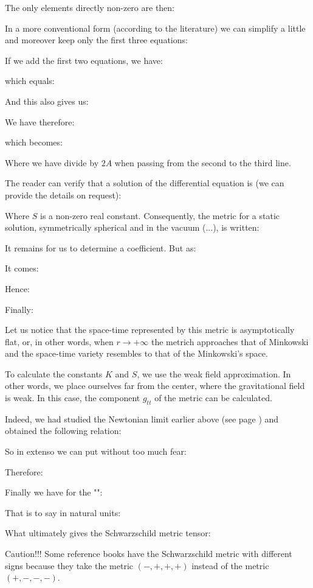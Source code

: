 	The only elements directly non-zero are then:
	
	In a more conventional form (according to the literature) we can simplify a little and moreover keep only the first three equations:
	
	If we add the first two equations, we have:
	
	which equals:
	
	And this also gives us:
	
	We have therefore:
	
	which becomes:
	
	Where we have divide by $2A$ when passing from the second to the third line.

	The reader can verify that a solution of the differential equation is (we can provide the details on request):
	
	Where $S$ is a non-zero real constant. Consequently, the metric for a static solution, symmetrically spherical and in the vacuum (...), is written:
	
	It remains for us to determine a coefficient. But as:
	
	It comes:
	
	Hence:
	
	Finally:
	
	Let us notice that the space-time represented by this metric is asymptotically flat, or, in other words, when $r\rightarrow +\infty$ the metrich approaches that of Minkowski and the space-time variety resembles to that of the Minkowski's space.

	To calculate the constants $K$ and $S$, we use the weak field approximation. In other words, we place ourselves far from the center, where the gravitational field is weak. In this case, the component $g_{tt}$ of the metric can be calculated.

	Indeed, we had studied the Newtonian limit earlier above (see page \pageref{newtonian limit}) and obtained the following relation:
	
	So in extenso we can put without too much fear:
	
	Therefore:
	
	Finally we have for the "":
	
	That is to say in natural units:
	
	What ultimately gives the Schwarzschild metric tensor:
	
	Caution!!! Some reference books have the Schwarzschild metric with different signs because they take the metric $(-, +, +, +)$ instead of the metric $(+, -, -, -)$.
	
